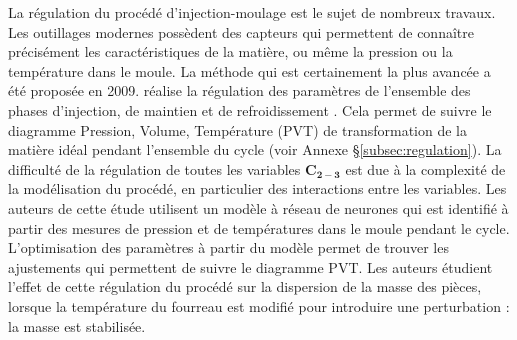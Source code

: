 La régulation du procédé d'injection-moulage est le  sujet de nombreux travaux.
Les outillages modernes possèdent des capteurs qui permettent de connaître précisément les caractéristiques de la matière, ou même la pression ou la température dans le moule.
La méthode qui est certainement la plus avancée a été proposée en 2009.
\citeauthor{michaeli_online_2009} réalise la régulation des paramètres de l'ensemble des phases d'injection, de maintien et de refroidissement \cite{michaeli_online_2009}.
Cela permet de suivre le diagramme Pression, Volume, Température (PVT) de transformation de la matière idéal pendant l'ensemble du cycle (voir Annexe §\ref{subsec:regulation}).
La difficulté de la régulation de toutes les variables $\boldsymbol{C_{2-3}}$ est due à la complexité de la modélisation du procédé, en particulier des interactions entre les variables.
Les auteurs de cette étude utilisent un modèle à réseau de neurones qui est identifié à partir des mesures de pression et de températures dans le moule pendant le cycle.
L'optimisation des paramètres à partir du modèle permet de trouver les ajustements qui permettent de suivre le diagramme PVT.
Les auteurs étudient l'effet de cette régulation du procédé sur la dispersion de la masse des pièces, lorsque la température du fourreau est modifié pour introduire une perturbation : la masse est stabilisée.

